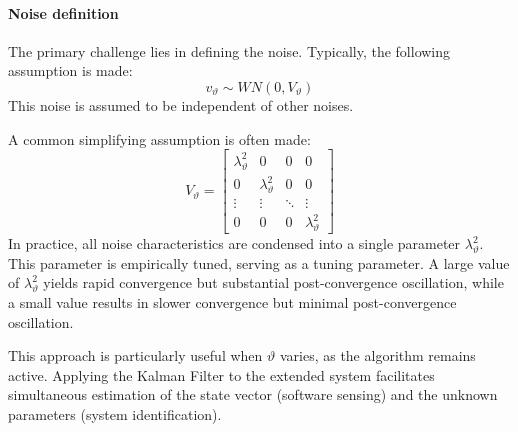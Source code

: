 \paragraph*{Noise definition}
The primary challenge lies in defining the noise. 
Typically, the following assumption is made:
\[v_\vartheta\sim WN(0,V_\vartheta)\]
This noise is assumed to be independent of other noises.

A common simplifying assumption is often made:
\[V_{\vartheta}=\begin{bmatrix} \lambda_\vartheta^2 & 0 & 0 & 0 \\ 0 & \lambda_\vartheta^2 & 0 & 0 \\ \vdots &  \vdots & \ddots & \vdots \\ 0 & 0 & 0 & \lambda_\vartheta^2 \end{bmatrix}\]
In practice, all noise characteristics are condensed into a single parameter $\lambda_\vartheta^2$. 
This parameter is empirically tuned, serving as a tuning parameter.
A large value of  $\lambda_\vartheta^2$ yields rapid convergence but substantial post-convergence oscillation, while a small value results in slower convergence but minimal post-convergence oscillation.

This approach is particularly useful when $\vartheta$ varies, as the algorithm remains active. 
Applying the Kalman Filter to the extended system facilitates simultaneous estimation of the state vector (software sensing) and the unknown parameters (system identification).